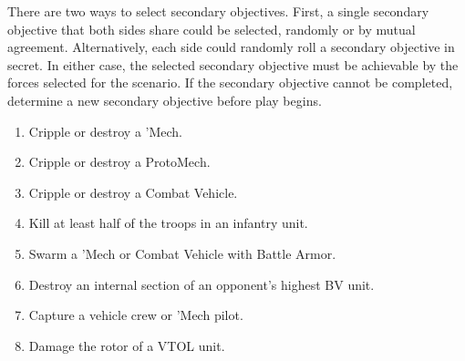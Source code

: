 There are two ways to select secondary objectives.
First, a single secondary objective that both sides share could be selected, randomly or by mutual agreement.
Alternatively, each side could randomly roll a secondary objective in secret.
In either case, the selected secondary objective must be achievable by the forces selected for the scenario.
If the secondary objective cannot be completed, determine a new secondary objective before play begins.

\begin{enumerate}

\item Cripple or destroy a 'Mech.

\item Cripple or destroy a ProtoMech.

\item Cripple or destroy a Combat Vehicle.

\item Kill at least half of the troops in an infantry unit.

\item Swarm a 'Mech or Combat Vehicle with Battle Armor.

\item Destroy an internal section of an opponent's highest BV unit.

\item Capture a vehicle crew or 'Mech pilot.

\item Damage the rotor of a VTOL unit.

\end{enumerate}
